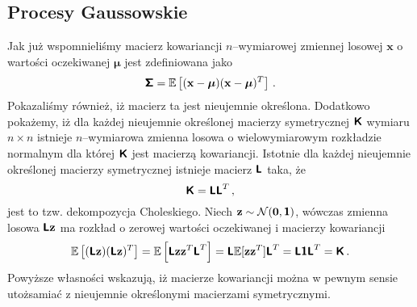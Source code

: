 \documentclass{myclass}
\begin{document}
\subsection{Procesy Gaussowskie}

Jak już wspomnieliśmy macierz kowariancji \(n\)--wymiarowej zmiennej losowej \(\mathbf{x}\) o
wartości oczekiwanej \(\boldsymbol{\mu}\) jest zdefiniowana jako
\begin{equation*}
    \boldsymbol{\mathsf{\Sigma}} = \mathbb{E}\left[(\mathbf{x} - \boldsymbol{\mu})(\mathbf{x} - \boldsymbol{\mu})^T\right]\,.
\end{equation*}
Pokazaliśmy również, iż macierz ta jest nieujemnie określona. Dodatkowo pokażemy, iż dla każdej
nieujemnie określonej macierzy symetrycznej \(\boldsymbol{\mathsf{K}}\) wymiaru \(n\times n\) istnieje
\(n\)--wymiarowa zmienna losowa o wielowymiarowym rozkładzie normalnym dla której \(\boldsymbol{\mathsf{K}}\) jest
macierzą kowariancji. Istotnie dla każdej nieujemnie określonej macierzy symetrycznej istnieje
macierz \(\boldsymbol{\mathsf{L}}\) taka, że
\begin{equation*}
    \boldsymbol{\mathsf{K}} = \boldsymbol{\mathsf{L}}\boldsymbol{\mathsf{L}}^T\,,
\end{equation*}
jest to tzw. dekompozycja Choleskiego. Niech \(\mathbf{z} \sim \mathcal{N}(\mathbf{0}, \boldsymbol{\mathsf{1}})\),
wówczas zmienna losowa \(\boldsymbol{\mathsf{L}}\mathbf{z}\) ma rozkład o zerowej wartości oczekiwanej i macierzy
kowariancji
\begin{equation*}
    \mathbb{E}\left[(\boldsymbol{\mathsf{L}}\mathbf{z})(\boldsymbol{\mathsf{L}}\mathbf{z})^T\right] = \mathbb{E}\left[\boldsymbol{\mathsf{L}}\mathbf{z}\mathbf{z}^T\boldsymbol{\mathsf{L}}^T\right] = \boldsymbol{\mathsf{L}}\mathbb{E}[\mathbf{z}\mathbf{z}^T]\boldsymbol{\mathsf{L}}^T = \boldsymbol{\mathsf{L}}\boldsymbol{\mathsf{1}}\boldsymbol{\mathsf{L}}^T = \boldsymbol{\mathsf{K}}\,.
\end{equation*}
Powyższe własności wskazują, iż macierze kowariancji można w pewnym sensie utożsamiać z nieujemnie
określonymi macierzami symetrycznymi.
\end{document}

